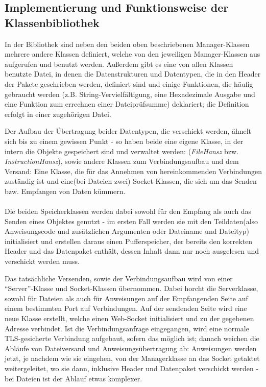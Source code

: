 \subsection{Implementierung und Funktionsweise der Klassenbibliothek}
In der Bibliothek sind neben den beiden oben beschriebenen Manager-Klassen mehrere andere Klassen definiert, welche von den jeweiligen Manager-Klassen aus aufgerufen und benutzt werden.
Außerdem gibt es eine von allen Klassen benutzte Datei, in denen die Datenstrukturen und Datentypen, die in den Header der Pakete geschrieben werden, definiert sind und einige Funktionen, die häufig gebraucht werden (z.B. String-Vervielfältigung, eine Hexadezimale Ausgabe und eine Funktion zum errechnen einer Dateiprüfsumme) deklariert; die Definition erfolgt in einer zugehörigen Datei.\par
Der Aufbau der Übertragung beider Datentypen, die verschickt werden, ähnelt sich bis zu einem gewissen Punkt - so haben beide eine eigene Klasse, in der intern die Objekte gespeichert sind und verwaltet werden: (\textit{FileHansz} bzw. \textit{InstructionHansz}), sowie andere Klassen zum Verbindungsaufbau und dem Versand: Eine Klasse, die für das Annehmen von hereinkommenden Verbindungen zuständig ist und eine(bei Dateien zwei) Socket-Klassen, die sich um das Senden bzw. Empfangen von Daten kümmern.\\\\
Die beiden Speicherklassen werden dabei sowohl für den Empfang als auch das Senden eines Objektes genutzt - im ersten Fall werden sie mit den Teildaten(also Anweisungscode und zusätzlichen Argumenten oder Dateiname und Dateityp) initialisiert und erstellen daraus einen Pufferspeicher, der bereits den korrekten Header und das Datenpaket enthält, dessen Inhalt dann nur noch ausgelesen und verschickt werden muss.\par
Das tatsächliche Versenden, sowie der Verbindungsaufbau wird von einer "`Server"'-Klasse und Socket-Klassen übernommen.
Dabei horcht die Serverklasse, sowohl für Dateien als auch für Anweisungen auf der Empfangenden Seite auf einem bestimmten Port auf Verbindungen.
Auf der sendenden Seite wird eine neue Klasse erstellt, welche einen Web-Socket initialisiert und zu der gegebenen Adresse verbindet.
Ist die Verbindungsanfrage eingegangen, wird eine normale TLS-gesicherte Verbindung aufgebaut, sofern das möglich ist; danach weichen die Abläufe von Dateiversand und Anweisungsübertragung ab: Anweisungen werden jetzt, je nachdem wie sie eingehen, von der Managerklasse an das Socket getaktet weitergeleitet, wo sie dann, inklusive Header und Datenpaket verschickt werden - bei Dateien ist der Ablauf etwas komplexer.\par 
